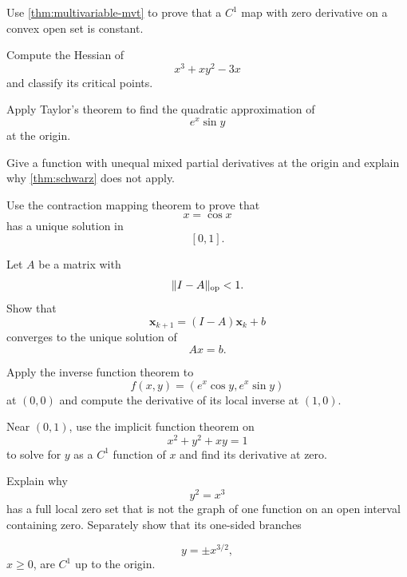 \begin{exercise}
Use \cref{thm:multivariable-mvt} to prove that a $C^1$ map with zero
derivative on a convex open set is constant.
\end{exercise}

\begin{exercise}
Compute the Hessian of
\[
x^3+xy^2-3x
\]
and classify its critical points.
\end{exercise}

\begin{exercise}
Apply Taylor's theorem to find the quadratic approximation of
\[
e^x\sin y
\]
at the origin.
\end{exercise}

\begin{exercise}
Give a function with unequal mixed partial derivatives at the origin and
explain why \cref{thm:schwarz} does not apply.
\end{exercise}

\begin{exercise}
Use the contraction mapping theorem to prove that
\[
x=\cos x
\]
has a unique solution in
\[
[0,1].
\]
\end{exercise}

\begin{exercise}
Let $A$ be a matrix with
\[
\lVert I-A\rVert_{\mathrm{op}}<1.
\]
Show that
\[
\mathbf{x}_{k+1}=(I-A)\mathbf{x}_k+b
\]
converges to the unique solution of
\[
Ax=b.
\]
\end{exercise}

\begin{exercise}
Apply the inverse function theorem to
\[
f(x,y)=(e^x\cos y,e^x\sin y)
\]
at $(0,0)$ and compute the derivative of its local inverse at $(1,0)$.
\end{exercise}

\begin{exercise}
Near $(0,1)$, use the implicit function theorem on
\[
x^2+y^2+xy=1
\]
to solve for $y$ as a $C^1$ function of $x$ and find its derivative at zero.
\end{exercise}

\begin{exercise}
Explain why
\[
y^2=x^3
\]
has a full local zero set that is not the graph of one function on an
open interval containing zero. Separately show that its one-sided branches

\[
y=\pm x^{3/2},
\]
 $x\geq0$, are $C^1$ up to the origin.
\end{exercise}


